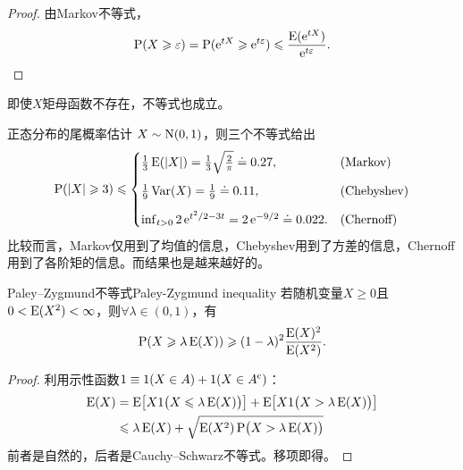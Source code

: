 \begin{proof}
	由Markov不等式，
	\[
		\operatorname{P}(X \geqslant \varepsilon) = \operatorname{P}(\mathop{}\!\mathrm{e}^{tX} \geqslant \mathop{}\!\mathrm{e}^{t\varepsilon}) \leqslant \frac{\operatorname{E}(\mathop{}\!\mathrm{e}^{tX})}{\mathop{}\!\mathrm{e}^{t\varepsilon}}.
		\qedhere
	\]
\end{proof}
\begin{remark}
	即使$X$矩母函数不存在，不等式也成立。
\end{remark}

\begin{example}{正态分布的尾概率估计}{}
	$X \sim \operatorname{N}(0,1)$，则三个不等式给出
	\[
		\operatorname{P}(\lvert X\rvert \geqslant 3) \leqslant \begin{cases}
			\frac13\operatorname{E}(\lvert X\rvert) = \frac13\sqrt{\frac2\pi} \doteq 0.27,&\text{(Markov)}\\[2ex]
			\frac19\operatorname{Var}(X) = \frac19 \doteq 0.11,&\text{(Chebyshev)}\\[2ex]
			\inf_{t>0}2\mathop{}\!\mathrm{e}^{t^2/2-3t} = 2\mathop{}\!\mathrm{e}^{-9/2} \doteq 0.022.&\text{(Chernoff)}
		\end{cases}
	\]
	比较而言，Markov仅用到了均值的信息，Chebyshev用到了方差的信息，Chernoff用到了各阶矩的信息。而结果也是越来越好的。
\end{example}

\begin{theorem}
	{Paley--Zygmund不等式}{Paley-Zygmund inequality}
	若随机变量$X \geqslant 0$且$0 < \operatorname{E}(X^2) < \infty$，则$\forall\lambda \in (0,1)$，有
	\begin{equation}
		\label{eqn:Paley-Zygmund ineq}
		\operatorname{P}(X \geqslant \lambda\operatorname{E}(X)) \geqslant (1 - \lambda)^2\frac{\operatorname{E}(X)^2}{\operatorname{E}(X^2)}.
	\end{equation}
\end{theorem}

\begin{proof}
	利用示性函数$1 \equiv 1(X \in A) + 1(X \in A^{\mathrm c})$：
	\begin{align*}
		\operatorname{E}(X) &= \operatorname{E}\bigl[X1\bigl(X \leqslant \lambda\operatorname{E}(X)\bigr)\bigr] + \operatorname{E}\bigl[X1\bigl(X > \lambda\operatorname{E}(X)\bigr)\bigr]\\
		&\leqslant \lambda\operatorname{E}(X) + \sqrt{\operatorname{E}(X^2)\operatorname{P}\bigl(X > \lambda\operatorname{E}(X)\bigr)}
	\end{align*}
	前者是自然的，后者是Cauchy--Schwarz不等式。移项即得。
\end{proof}

